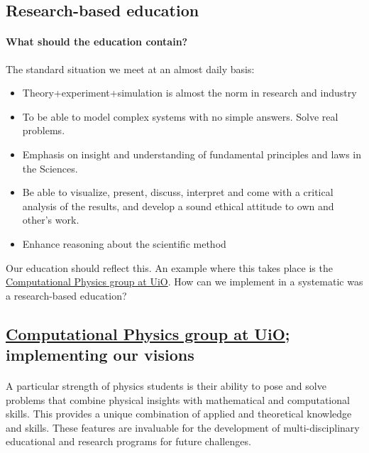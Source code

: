 \documentclass[%
twoside,                 %
final,                   %
10pt]{article}
\begin{document}
\subsection*{Research-based education}

\paragraph{What should the education contain?}
The standard situation we meet at an almost daily basis:

\begin{itemize}
\item Theory+experiment+simulation is almost the norm in research and industry

\item To be able to model complex systems with no simple answers. Solve real problems.

\item Emphasis on insight and understanding of fundamental principles and laws in the Sciences.

\item Be able to visualize, present, discuss, interpret and come with a critical analysis of the results, and develop a sound ethical attitude to own and other's work.

\item Enhance reasoning about the scientific method
\end{itemize}

\noindent
Our education should reflect this. An example where this takes place is the \href{{http://www.mn.uio.no/fysikk/english/research/groups/computational/index.html}}{Computational Physics group at UiO}.  How can we implement in a systematic was a research-based education?




\subsection*{\href{{http://www.mn.uio.no/fysikk/english/research/groups/computational/index.html}}{Computational Physics group at UiO}; implementing our visions}

\paragraph{}
A particular strength of physics students is their ability to pose and
solve problems that combine physical insights with mathematical
and  computational skills. This provides a unique combination
of applied and theoretical knowledge and skills. These features are invaluable 
for the development of multi-disciplinary educational and research programs for future challenges.
\end{document}
